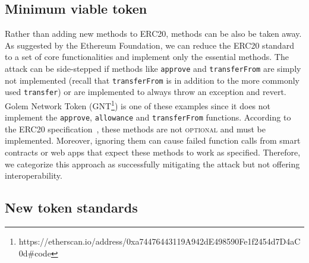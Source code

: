 %
%

\subsection{Minimum viable token}

Rather than adding new methods to ERC20, methods can be also be taken away. As suggested by the Ethereum Foundation\cite{Ref05}, we can reduce the ERC20 standard to a set of core functionalities and implement only the essential methods. The attack can be side-stepped if methods like \texttt{approve} and \texttt{transferFrom} are simply not implemented (recall that \texttt{transferFrom} is in addition to the more commonly used \texttt{transfer}) or are implemented to always throw an exception and revert. Golem Network Token (GNT\footnote{https://etherscan.io/address/0xa74476443119A942dE498590Fe1f2454d7\newline D4aC0d\#code}) is one of these examples since it does not implement the \texttt{approve}, \texttt{allowance} and \texttt{transferFrom} functions. According to the ERC20 specification~\cite{Ref08}, these methods are not \textsc{optional} and must be implemented. Moreover, ignoring them can cause failed function calls from smart contracts or web apps that expect these methods to work as specified. Therefore, we categorize this approach as successfully mitigating the attack but not offering interoperability.

\subsection{New token standards}

